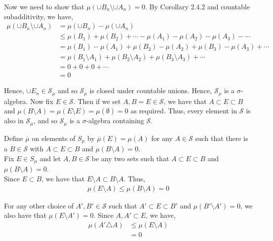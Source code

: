 \documentclass[12pt]{article}
\newenvironment{problem}[2][Problem]{\begin{trivlist}
\item[\hskip \labelsep {\bfseries #1}\hskip \labelsep {\bfseries #2.}]}{\end{trivlist}}
\begin{document}
Now we need to show that $\mu(\cup B_n \setminus \cup A_n) = 0$. By Corollary 2.4.2 and countable subadditivity, we have,
\begin{align*}
\mu(\cup B_n \setminus \cup A_n) &= \mu(\cup B_n) - \mu(\cup A_n)\\
&\leq \mu(B_1) + \mu(B_2) + \cdots - \mu(A_1) - \mu(A_2) - \mu(A_3) - \cdots\\
&= \mu(B_1) - \mu(A_1) + \mu(B_2) - \mu(A_2) + \mu(B_3) - \mu(A_3) + \cdots\\
&= \mu(B_1 \setminus A_1) + \mu(B_2 \setminus A_2) + \mu(B_3 \setminus A_3) + \cdots\\
&= 0 + 0 + 0 + \cdots\\
&= 0
\end{align*}

Hence, $\cup E_n \in \mathcal{S}_{\mu}$ and so $\mathcal{S}_{\mu}$ is closed under countable unions. Hence, $\mathcal{S}_{\mu}$ is a $\sigma$-algebra. Now fix $E \in \mathcal{S}$. Then if we set $A, B = E \in \mathcal{S}$, we have that $A \subset E \subset B$ and $\mu(B \setminus A) = \mu(E \setminus E) = \mu(\emptyset) = 0$ as required. Thus, every element in $\mathcal{S}$ is also in $\mathcal{S}_{\mu}$, and so $\mathcal{S}_{\mu}$ is a $\sigma$-algebra containing $\mathcal{S}$.

\begin{problem}{15}
\end{problem}

Define $\overline{\mu}$ on elements of $S_{\mu}$ by $\overline{\mu}(E) = \mu(A)$ for any $A \in \mathcal{S}$ such that there is a $B \in \mathcal{S}$ with $A \subset E \subset B$ and $\mu(B \setminus A) = 0$.\\

Fix $E \in S_{\mu}$ and let $A, B \in \mathcal{S}$ be any two sets such that $A \subset E \subset B$ and $\mu(B \setminus A) = 0$.\\

Since $E \subset B$, we have that $E \setminus A \subset B \setminus A$. Thus,
\begin{align*}
\mu(E \setminus A) \leq \mu(B \setminus A) = 0
\end{align*}

For any other choice of $A', B' \in \mathcal{S}$ such that $A' \subset E \subset B'$ and $\mu(B' \setminus A') = 0$, we also have that $\mu(E \setminus A') = 0$. Since $A, A' \subset E$, we have,
\begin{align*}
\mu(A' \triangle A) &\leq \mu(E \setminus A)\\
&= 0
\end{align*}
\end{document}
